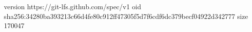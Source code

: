version https://git-lfs.github.com/spec/v1
oid sha256:34280ba393213c66d4fe80c912ff47305f5d7f6cdf6dc379becf04922d342777
size 170047
